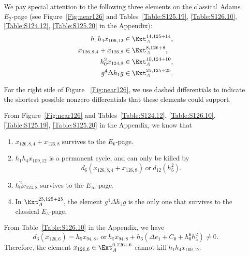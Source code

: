 \documentclass{amsart}
\numberwithin{equation}{section}
\begin{document}
We pay special attention to the following three elements on the classical Adams $E_2$-page (see Figure~\ref{Fig:near126} and Tables~\ref{Table:S125.19}, \ref{Table:S126.10}, \ref{Table:S124.12}, \ref{Table:S125.20} in the Appendix): 
\begin{align*}
    h_1h_4x_{109,12} & \in \Ext_A^{14, 125+14}, \\
    x_{126,8,4} + x_{126,8} & \in \Ext_A^{8, 126+8}, \\
    h_0^2x_{124,8} & \in \Ext_A^{10, 124+10},\\
    g^4\Delta h_1g & \in \Ext_A^{25,125+25}.
\end{align*}

For the right side of Figure ~\ref{Fig:near126}, we use dashed differentials to indicate the shortest possible nonzero differentials that these elements could support.

{

}

From Figure~\ref{Fig:near126} and Tables~\ref{Table:S124.12}, \ref{Table:S126.10}, \ref{Table:S125.19}, \ref{Table:S125.20} in the Appendix, we know that
\begin{fact} \label{fact:theta5sqAF}
\begin{enumerate}
    \item $x_{126,8,4} + x_{126,8}$ survives to the $E_6$-page.
    
    \item $h_1h_4x_{109,12}$ is a permanent cycle, and can only be killed by 
    $$d_6(x_{126,8,4} + x_{126,8}) \ \text{or} \ d_{12}(h_6^2).$$
    
    \item $h_0^2x_{124,8}$ survives to the $E_\infty$-page.

    \item In $\Ext_A^{25,125+25}$, the element $g^4\Delta h_1g$ is the only one that survives to the classical $E_5$-page.
\end{enumerate}\end{fact}

\begin{remark}
From Table~\ref{Table:S126.10} in the Appendix, we have
   $$d_3(x_{126,6}) = h_5x_{94,8}, \ \text{or} \ h_5x_{94,8} + h_6(\Delta e_1 + C_0 + h_0^6h_5^2) \neq 0.$$
   Therefore, the element $x_{126,6} \in \Ext_A^{6, 126+6}$ cannot kill $h_1h_4x_{109,12}$.
\end{remark}
\end{document}
